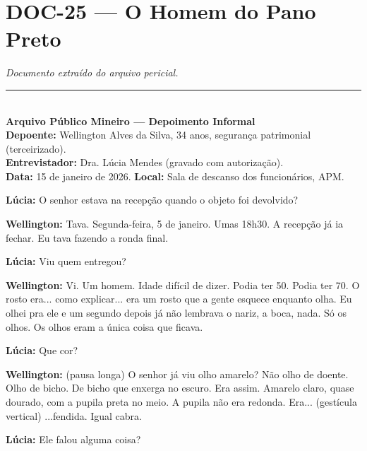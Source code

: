 \section*{\textbf{DOC-25} --- O Homem do Pano Preto}

\noindent \textit{Documento extraído do arquivo pericial.}

\vspace{0.5em}\noindent\rule{\textwidth}{0.5pt}\vspace{0.5em}

\\[-0.2em]

\noindent \textbf{Arquivo Público Mineiro --- Depoimento Informal}\\
\noindent \textbf{Depoente:} Wellington Alves da Silva, 34 anos, segurança patrimonial (terceirizado).\\
\noindent \textbf{Entrevistador:} Dra. Lúcia Mendes (gravado com autorização).\\
\noindent\textbf{Data:} 15 de janeiro de 2026. \textbf{Local:} Sala de descanso dos funcionários, APM.

\noindent \textbf{Lúcia:} O senhor estava na recepção quando o objeto foi devolvido?

\noindent \textbf{Wellington:} Tava. Segunda-feira, 5 de janeiro. Umas 18h30. A recepção já ia fechar. Eu tava fazendo a ronda final.

\noindent \textbf{Lúcia:} Viu quem entregou?

\noindent \textbf{Wellington:} Vi. Um homem. Idade difícil de dizer. Podia ter 50. Podia ter 70. O rosto era... como explicar... era um rosto que a gente esquece enquanto olha. Eu olhei pra ele e um segundo depois já não lembrava o nariz, a boca, nada. Só os olhos. Os olhos eram a única coisa que ficava.

\noindent \textbf{Lúcia:} Que cor?

\noindent \textbf{Wellington:} (pausa longa) O senhor já viu olho amarelo? Não olho de doente. Olho de bicho. De bicho que enxerga no escuro. Era assim. Amarelo claro, quase dourado, com a pupila preta no meio. A pupila não era redonda. Era... (gestícula vertical) ...fendida. Igual cabra.

\noindent \textbf{Lúcia:} Ele falou alguma coisa?


